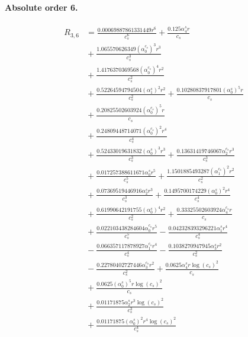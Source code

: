 \documentclass[10pt]{article}
\begin{document}
\paragraph{Absolute order 6.}
\begin{align*}
R_{3,6} &= \frac{0.00069887861331449 r^{6}}{c_{s}^{6}} + \frac{0.125 \alpha_{4}^s r}{c_{s}} \\
&{}  + \frac{1.065570626349 \left(\alpha_{0}^{c_s}\right)^{3} r^{3}}{c_{s}^{3}} \\
&{}  + \frac{1.4176370369568 \left(\alpha_{0}^{c_s}\right)^{4} r^{2}}{c_{s}^{2}} \\
&{}  + \frac{0.52264594794504 \left(\alpha_{1}^s\right)^{2} r^{2}}{c_{s}^{2}} + \frac{0.10280837917801 \left(\alpha_{0}^s\right)^{5} r}{c_{s}} \\
&{}  + \frac{0.20825502603924 \left(\alpha_{0}^{c_s}\right)^{5} r}{c_{s}} \\
&{}  + \frac{0.24809448714071 \left(\alpha_{0}^{c_s}\right)^{2} r^{4}}{c_{s}^{4}} \\
&{}  + \frac{0.52433019631832 \left(\alpha_{0}^s\right)^{3} r^{3}}{c_{s}^{3}} + \frac{0.13631419746067 \alpha_{2}^{c_s} r^{3}}{c_{s}^{3}} \\
&{}  + \frac{0.017257388611671 \alpha_{0}^s r^{5}}{c_{s}^{5}} + \frac{1.1501885493287 \left(\alpha_{1}^{c_s}\right)^{2} r^{2}}{c_{s}^{2}} \\
&{}  + \frac{0.07369519446916 \alpha_{2}^s r^{3}}{c_{s}^{3}} + \frac{0.1495700174229 \left(\alpha_{0}^s\right)^{2} r^{4}}{c_{s}^{4}} \\
&{}  + \frac{0.61990642191755 \left(\alpha_{0}^s\right)^{4} r^{2}}{c_{s}^{2}} + \frac{0.33325502603924 \alpha_{4}^{c_s} r}{c_{s}} \\
&{}  + \frac{0.022103438284604 \alpha_{0}^{c_s} r^{5}}{c_{s}^{5}} - \frac{0.042328393296221 \alpha_{1}^s r^{4}}{c_{s}^{4}} \\
&{}  - \frac{0.066357117878927 \alpha_{1}^{c_s} r^{4}}{c_{s}^{4}} - \frac{0.1038270947945 \alpha_{3}^s r^{2}}{c_{s}^{2}} \\
&{}  - \frac{0.22780402727446 \alpha_{3}^{c_s} r^{2}}{c_{s}^{2}} + \frac{0.0625 \alpha_{4}^s r \log{\left(c_{s} \right)}^{2}}{c_{s}} \\
&{}  + \frac{0.0625 \left(\alpha_{0}^s\right)^{5} r \log{\left(c_{s} \right)}^{2}}{c_{s}} \\
&{}  + \frac{0.01171875 \alpha_{2}^s r^{3} \log{\left(c_{s} \right)}^{2}}{c_{s}^{3}} \\
&{}  + \frac{0.01171875 \left(\alpha_{0}^s\right)^{2} r^{4} \log{\left(c_{s} \right)}^{2}}{c_{s}^{4}} \\

\end{align*}
\end{document}
